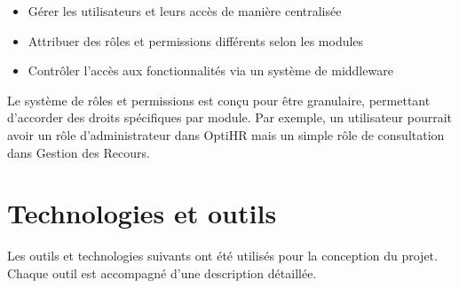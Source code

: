 \begin{itemize}
    \item Gérer les utilisateurs et leurs accès de manière centralisée
    \item Attribuer des rôles et permissions différents selon les modules
    \item Contrôler l'accès aux fonctionnalités via un système de middleware
\end{itemize}

Le système de rôles et permissions est conçu pour être granulaire, permettant d'accorder des droits spécifiques par module. Par exemple, un utilisateur pourrait avoir un rôle d'administrateur dans OptiHR mais un simple rôle de consultation dans Gestion des Recours.

\section{Technologies et outils}
Les outils et technologies suivants ont été utilisés pour la conception du
projet. Chaque outil est accompagné d'une description détaillée.

\renewcommand{\arraystretch}{1.5} %

